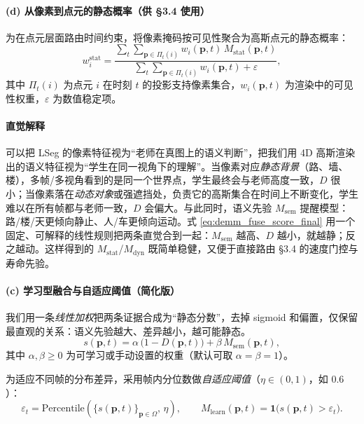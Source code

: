 \documentclass[10pt,conference]{IEEEtran} %
\begin{document}
\paragraph{(d) 从像素到点元的静态概率（供 §3.4 使用）}
为在点元层面路由时间约束，将像素掩码按可见性聚合为高斯点元的静态概率：
\begin{equation}
w_i^{\mathrm{stat}}=
\frac{\sum_{t}\sum_{\mathbf p\in\Pi_t(i)} w_i(\mathbf p,t)\,M_{\mathrm{stat}}(\mathbf p,t)}
{\sum_{t}\sum_{\mathbf p\in\Pi_t(i)} w_i(\mathbf p,t)+\varepsilon},
\label{eq:demm_point_final}
\end{equation}
其中 $\Pi_t(i)$ 为点元 $i$ 在时刻 $t$ 的投影支持像素集合，$w_i(\mathbf p,t)$ 为渲染中的可见性权重，$\varepsilon$ 为数值稳定项。

\paragraph{直觉解释}
可以把 LSeg 的像素特征视为“老师在真图上的语义判断”，把我们用 4D 高斯渲染出的语义特征视为“学生在同一视角下的理解”。当像素对应\emph{静态背景}（路、墙、楼），多帧/多视角看到的是同一个世界点，学生最终会与老师高度一致，$D$ 很小；当像素落在\emph{动态对象}或强遮挡处，负责它的高斯集合在时间上不断变化，学生难以在所有帧都与老师一致，$D$ 会偏大。与此同时，语义先验 $M_{\mathrm{sem}}$ 提醒模型：路/楼/天更倾向静止、人/车更倾向运动。式 \eqref{eq:demm_fuse_score_final} 用一个固定、可解释的线性规则把两条直觉合到一起：$M_{\mathrm{sem}}$ 越高、$D$ 越小，就越静；反之越动。这样得到的 $M_{\mathrm{stat}}$/$M_{\mathrm{dyn}}$ 既简单稳健，又便于直接路由 §3.4 的速度门控与寿命先验。

\paragraph{(c) 学习型融合与自适应阈值（简化版）}
我们用一条\emph{线性加权}把两条证据合成为“静态分数”，去掉 sigmoid 和偏置，仅保留最直观的关系：语义先验越大、差异越小，越可能静态。
\begin{equation}
s(\mathbf p,t)=\alpha\,\bigl(1-D(\mathbf p,t)\bigr)+\beta\,M_{\mathrm{sem}}(\mathbf p,t),
\label{eq:demm_score_simple}
\end{equation}
其中 $\alpha,\beta\ge 0$ 为可学习或手动设置的权重（默认可取 $\alpha=\beta=1$）。

为适应不同帧的分布差异，采用帧内分位数做\emph{自适应阈值}（$\eta\in(0,1)$，如 $0.6$）：
\begin{equation}
\varepsilon_t=\mathrm{Percentile}\!\left(\{s(\mathbf p,t)\}_{\mathbf p\in\Omega},\,\eta\right),\qquad
M_{\mathrm{learn}}(\mathbf p,t)=\mathbf 1\!\bigl(s(\mathbf p,t)>\varepsilon_t\bigr).
\label{eq:demm_thresh_simple}
\end{equation}
\end{document}
